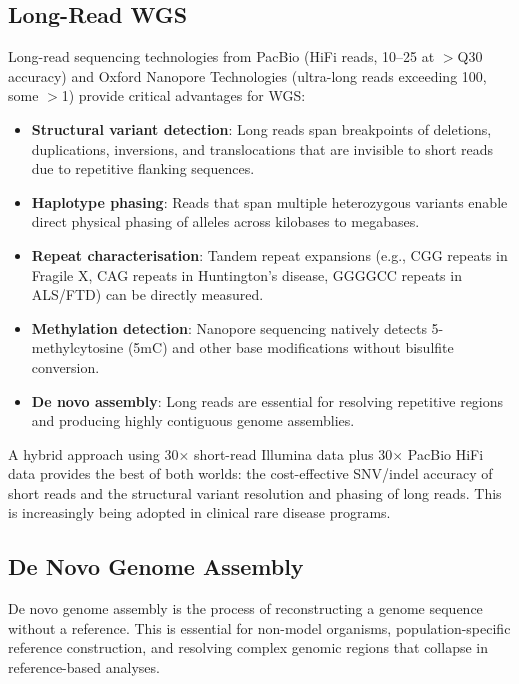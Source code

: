 \subsection{Long-Read WGS}

Long-read sequencing technologies from PacBio (HiFi reads, 10--25\kilobase{} at $>$Q30 accuracy) and Oxford Nanopore Technologies (ultra-long reads exceeding 100\kilobase{}, some $>$1\megabase{}) provide critical advantages for WGS:

\begin{itemize}[nosep]
  \item \textbf{Structural variant detection}: Long reads span breakpoints of deletions, duplications, inversions, and translocations that are invisible to short reads due to repetitive flanking sequences.
  \item \textbf{Haplotype phasing}: Reads that span multiple heterozygous variants enable direct physical phasing of alleles across kilobases to megabases.
  \item \textbf{Repeat characterisation}: Tandem repeat expansions (e.g.,  CGG repeats in Fragile X,  CAG repeats in Huntington's disease,  GGGGCC repeats in ALS/FTD) can be directly measured.
  \item \textbf{Methylation detection}: Nanopore sequencing natively detects 5-methylcytosine (5mC) and other base modifications without bisulfite conversion.
  \item \textbf{De novo assembly}: Long reads are essential for resolving repetitive regions and producing highly contiguous genome assemblies.
\end{itemize}

\begin{tipbox}[title={Combining Short and Long Reads}]
A hybrid approach using 30$\times$ short-read Illumina data plus 30$\times$ PacBio HiFi data provides the best of both worlds: the cost-effective SNV/indel accuracy of short reads and the structural variant resolution and phasing of long reads. This is increasingly being adopted in clinical rare disease programs.
\end{tipbox}

\subsection{De Novo Genome Assembly}
\label{subsec:denovo}

De novo genome assembly is the process of reconstructing a genome sequence without a reference. This is essential for non-model organisms, population-specific reference construction, and resolving complex genomic regions that collapse in reference-based analyses.

